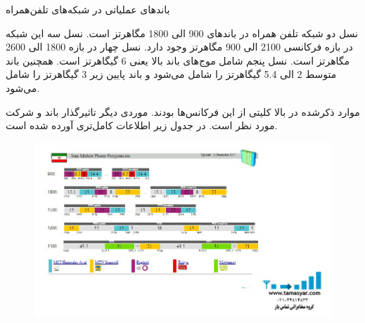\Problem
{باندهای عملیاتی در شبکه‌های تلفن‌همراه}
{
نسل دو شبکه تلفن همراه در باندهای 900 الی 1800 مگاهرتز است.
نسل سه این شبکه در بازه فرکانسی 2100 الی 900 مگاهرتز وجود دارد.
نسل چهار در بازه 1800 الی 2600 مگاهرتز است.
نسل پنجم شامل موج‌های باند بالا یعنی 6 گیگاهرتز است. همچنین باند متوسط 2 الی 5.4 گیگاهرتز را شامل می‌شود و باند پایین زیر 3 گیگاهرتز را شامل می‌شود.

موارد ذکرشده در بالا کلیتی از این فرکانس‌ها بودند. موردی دیگر تاثیرگذار باند و شرکت مورد نظر است. در جدول زیر اطلاعات کامل‌تری آورده شده است.

\begin{figure}[H]
    \includegraphics[width=15cm]{Images/Mobile-Frequencies-Iran.jpg}
    \centering
    \caption{}
\end{figure}
}
